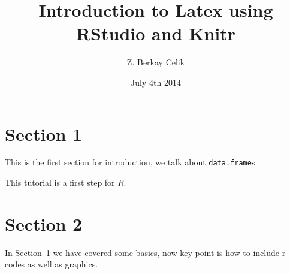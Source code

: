 \documentclass{article}\usepackage[]{graphicx}\usepackage[]{color}
\author{Z. Berkay Celik}
\title{ Introduction to Latex using RStudio and Knitr}
\date{July 4th 2014}
\newcommand{\dataframe}{\texttt{data.frame}}
\begin{document}
\maketitle
\tableofcontents

\section{Section 1}
\label{sec:section1}
This is the first section for introduction, we talk about \dataframe{}s.

This tutorial is a first step for \textit{R}.

\section{Section 2}
\label{section2}
In Section~\ref{sec:section1} we have covered some basics, now key point is how to include r codes as well as graphics.
\end{document}
